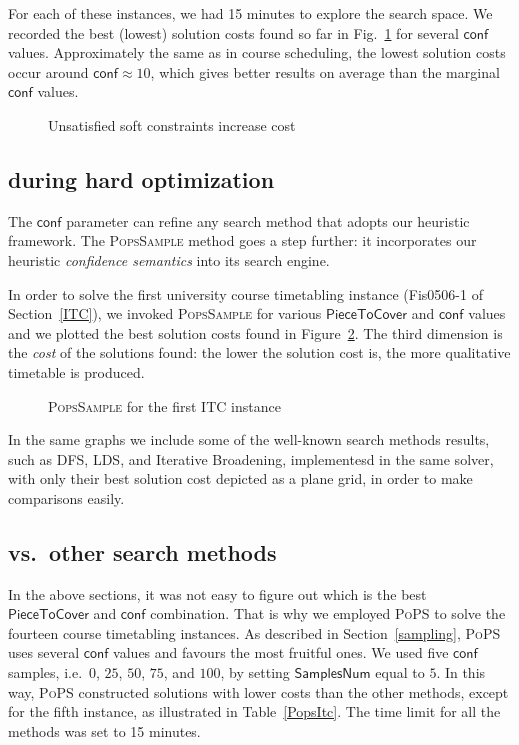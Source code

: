 \documentclass{ws-ijait}
\begin{document}
For each of these instances, we had 15 minutes to explore
the search space. We recorded the best (lowest) solution
costs found so far in Fig.~\ref{CELAR} for several
$\mathsf{conf}$ values. Approximately the same as in course
scheduling, the lowest solution costs occur around
$\mathsf{conf} \approx 10$, which gives better results on
average than the marginal $\mathsf{conf}$ values.

\begin{figure}
  \centering
  
  \caption{Unsatisfied soft constraints increase
           cost\label{CELAR}}
\end{figure}

\subsection{\PopsSample{} during hard
            optimization\label{PoPS}}

The $\mathsf{conf}$ parameter can refine any search method
that adopts our heuristic framework. The \textsc{PopsSample}
method goes a step further: it incorporates our heuristic
\emph{confidence semantics} into its search engine.

In order to solve the first university course timetabling
instance (\textsf{Fis0506-1} of Section~\ref{ITC}), we
invoked \textsc{PopsSample} for various
$\mathsf{PieceToCover}$ and $\mathsf{conf}$ values and we
plotted the best solution costs found in Figure~\ref{ITC1}.
The third dimension is the \emph{cost} of the solutions
found: the lower the solution cost is, the more qualitative
timetable is produced.

\begin{figure}
  \centering
  
  \caption{{\normalfont\textsc{PopsSample}} for the first
           ITC instance\label{ITC1}}
\end{figure}

In the same graphs we include some of the well-known search
methods results, such as DFS, LDS, and Iterative Broadening,
implementesd in the same solver, with only their best
solution cost depicted as a plane grid, in order to make
comparisons easily.

\subsection{\PoPS{} vs.\ other search methods}

In the above sections, it was not easy to figure out which
is the best $\mathsf{PieceToCover}$ and $\mathsf{conf}$
combination. That is why we employed \textsc{PoPS} to solve
the fourteen course timetabling instances. As described in
Section~\ref{sampling}, \textsc{PoPS} uses several
$\mathsf{conf}$ values and favours the most fruitful ones.
We used five $\mathsf{conf}$ samples, i.e.\ $0$, $25$, $50$,
$75$, and $100$, by setting $\mathsf{SamplesNum}$ equal to
$5$. In this way, \textsc{PoPS} constructed solutions with
lower costs than the other methods, except for the fifth
instance, as illustrated in Table~\ref{PopsItc}. The time
limit for all the methods was set to 15 minutes.
\end{document}
